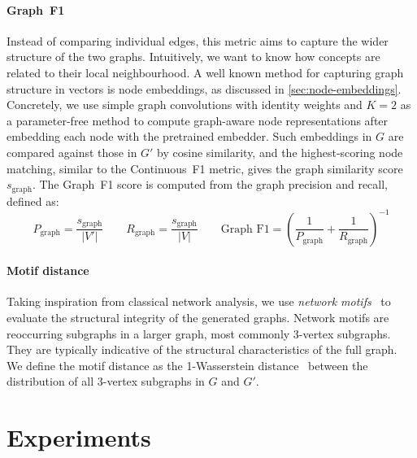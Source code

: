 \paragraph{Graph~F1}
Instead of comparing individual edges, this metric aims to capture the wider structure of the two graphs. Intuitively, we want to know how concepts are related to their local neighbourhood. A well known method for capturing graph structure in vectors is node embeddings, as discussed in \cref{sec:node-embeddings}. Concretely, we use simple graph convolutions \cite{wu2019simplifying} with identity weights and $K=2$ as a parameter-free method to compute graph-aware node representations after embedding each node with the pretrained embedder. Such embeddings in $G$ are compared against those in $G'$ by cosine similarity, and the highest-scoring node matching, similar to the Continuous~F1 metric, gives the graph similarity score $s_{\text{graph}}$. The Graph~F1 score is computed from the graph precision and recall, defined as:
\[
    P_{\text{graph}} = \frac{s_{\text{graph}}}{|V'|} \qquad
    R_{\text{graph}} = \frac{s_{\text{graph}}}{|V|} \qquad
    \text{Graph~F1} = \left(\frac{1}{P_{\text{graph}}} + \frac{1}{R_{\text{graph}}}\right)^{-1}
\]

\paragraph{Motif distance}
Taking inspiration from classical network analysis, we use \emph{network motifs}~\cite{milo2002network,shen2002network} to evaluate the structural integrity of the generated graphs. Network motifs are reoccurring subgraphs in a larger graph, most commonly 3-vertex subgraphs. They are typically indicative of the structural characteristics of the full graph. We define the motif distance as the 1-Wasserstein distance~\cite{Kantorovich1960MathematicalMO} between the distribution of all 3-vertex subgraphs in $G$ and $G'$.


\section{Experiments}  \label{sec:experiments}

